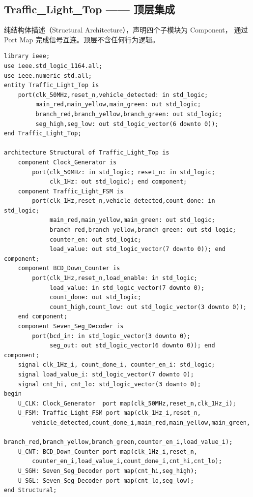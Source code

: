 \documentclass[12pt,a4paper]{ctexart}
\begin{document}
\subsection{Traffic\_Light\_Top —— 顶层集成}

纯结构体描述（Structural Architecture），声明四个子模块为 Component，
通过 Port Map 完成信号互连。顶层不含任何行为逻辑。

\begin{lstlisting}[caption={Traffic\_Light\_Top.vhd}]
library ieee;
use ieee.std_logic_1164.all;
use ieee.numeric_std.all;
entity Traffic_Light_Top is
    port(clk_50MHz,reset_n,vehicle_detected: in std_logic;
         main_red,main_yellow,main_green: out std_logic;
         branch_red,branch_yellow,branch_green: out std_logic;
         seg_high,seg_low: out std_logic_vector(6 downto 0));
end Traffic_Light_Top;

architecture Structural of Traffic_Light_Top is
    component Clock_Generator is
        port(clk_50MHz: in std_logic; reset_n: in std_logic;
             clk_1Hz: out std_logic); end component;
    component Traffic_Light_FSM is
        port(clk_1Hz,reset_n,vehicle_detected,count_done: in std_logic;
             main_red,main_yellow,main_green: out std_logic;
             branch_red,branch_yellow,branch_green: out std_logic;
             counter_en: out std_logic;
             load_value: out std_logic_vector(7 downto 0)); end component;
    component BCD_Down_Counter is
        port(clk_1Hz,reset_n,load_enable: in std_logic;
             load_value: in std_logic_vector(7 downto 0);
             count_done: out std_logic;
             count_high,count_low: out std_logic_vector(3 downto 0));
    end component;
    component Seven_Seg_Decoder is
        port(bcd_in: in std_logic_vector(3 downto 0);
             seg_out: out std_logic_vector(6 downto 0)); end component;
    signal clk_1Hz_i, count_done_i, counter_en_i: std_logic;
    signal load_value_i: std_logic_vector(7 downto 0);
    signal cnt_hi, cnt_lo: std_logic_vector(3 downto 0);
begin
    U_CLK: Clock_Generator  port map(clk_50MHz,reset_n,clk_1Hz_i);
    U_FSM: Traffic_Light_FSM port map(clk_1Hz_i,reset_n,
        vehicle_detected,count_done_i,main_red,main_yellow,main_green,
        branch_red,branch_yellow,branch_green,counter_en_i,load_value_i);
    U_CNT: BCD_Down_Counter port map(clk_1Hz_i,reset_n,
        counter_en_i,load_value_i,count_done_i,cnt_hi,cnt_lo);
    U_SGH: Seven_Seg_Decoder port map(cnt_hi,seg_high);
    U_SGL: Seven_Seg_Decoder port map(cnt_lo,seg_low);
end Structural;
\end{lstlisting}
\end{document}
